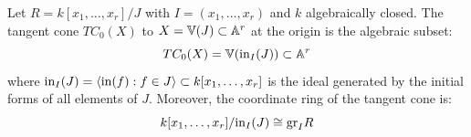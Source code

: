 \documentclass[12pt]{amsproc}
\begin{document}






    \begin{theorem}
    Let $R = k[x_1, \ldots, x_r]/J$ with $I = (x_1, \ldots, x_r)$ and 
    $k$ algebraically closed. The tangent cone $TC_0(X)$ to $X = \mathbb V(J) 
    \subset \mathbb A^r$ at the origin is the algebraic subset:
    \[TC_0(X) = \mathbb V(\text{in}_I(J)) \subset \mathbb A^r\]
    where $\text{in}_I(J) = \langle \text{in}(f) : f \in J \rangle \subset k[x_1, \ldots, x_r]$ 
    is the ideal generated by the initial forms of all elements of $J$. 
    Moreover, the coordinate ring of the tangent cone is:
    \[k[x_1, \ldots, x_r]/\text{in}_I(J) \cong \text{gr}_I R\]
    \end{theorem}

    


\end{document}
